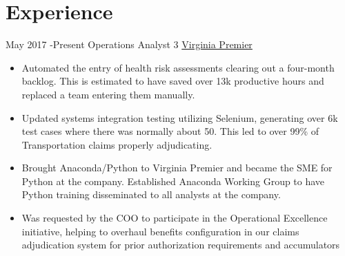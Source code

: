 \documentclass[letterpaper]{twentysecondcv} %
\begin{document}
\makeprofile %


\section{Experience}

\begin{twenty} %
\twentyitem
    	{May 2017 -}{Present}
        {Operations Analyst 3}
        {\href{https://www.virginiapremier.com/}{Virginia Premier}}
        {}
        {\begin{itemize}
			\item Automated the entry of health risk assessments clearing out a four-month backlog. This is estimated to have saved over 13k productive hours and replaced a team entering them manually.
			\item Updated systems integration testing utilizing Selenium, generating over 6k test cases where there was normally about 50. This led to over 99\% of Transportation claims properly adjudicating.
			\item Brought Anaconda/Python to Virginia Premier and became the SME for Python at the company. Established Anaconda Working Group to have Python training disseminated to all analysts at the company. 
			\item Was requested by the COO to participate in the Operational Excellence initiative, helping to overhaul benefits configuration in our claims adjudication system for prior authorization requirements and accumulators


\end{itemize}}
\end{twenty}
\end{document}
